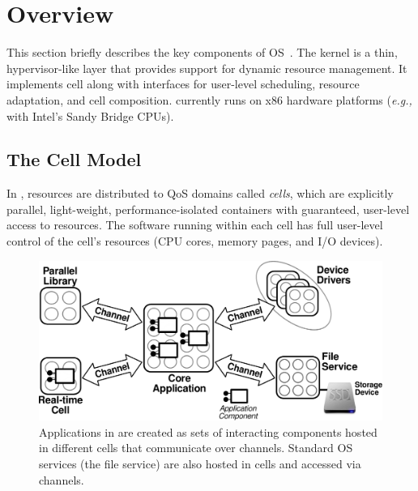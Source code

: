\section{\tess Overview}

This section briefly describes the key components of \tess OS~\cite{tess,tess_resource,tess_dac,tess_audio, tess_gui}.
The \tess kernel is a thin, hypervisor-like layer that provides support
for dynamic resource management.  It implements cell along with interfaces for user-level scheduling, resource
adaptation, and cell composition.  \tess currently runs on x86 hardware
platforms (\emph{e.g.,} with Intel's Sandy Bridge CPUs). 


\subsection{The Cell Model}\label{sec:cell-model}

In \tess, resources are distributed to QoS domains called
\emph{cells}, which are explicitly parallel, light-weight, performance-isolated containers
with guaranteed, user-level access to resources. The software running within each cell has full
user-level control of the cell's resources (\eg CPU cores, memory pages,
and I/O devices).  


\begin{figure}[tp]
\centering
\includegraphics[width=1.0\columnwidth]{Figures/app-split-into-cells.pdf}
\caption{
Applications in \tess are created as sets of interacting components
hosted in different cells that communicate over channels.
Standard OS services (\eg the file service) are also hosted in cells and
accessed via channels.
}
\label{fig:app-split-into-cells}
\end{figure}

